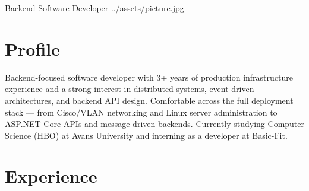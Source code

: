 \documentclass[a4paper,10pt]{article}
\begin{document}
  {Backend Software Developer}
  {\csep
   \csep
   }
  {\csep
   \csep
   }
  {../assets/picture.jpg}

\section{Profile}

Backend-focused software developer with 3+ years of production infrastructure experience and a strong interest in distributed systems, event-driven architectures, and backend API design.
Comfortable across the full deployment stack --- from Cisco/VLAN networking and Linux server administration to ASP.NET Core APIs and message-driven backends.
Currently studying Computer Science (HBO) at Avans University and interning as a developer at Basic-Fit.

\section{Experience}
\end{document}
